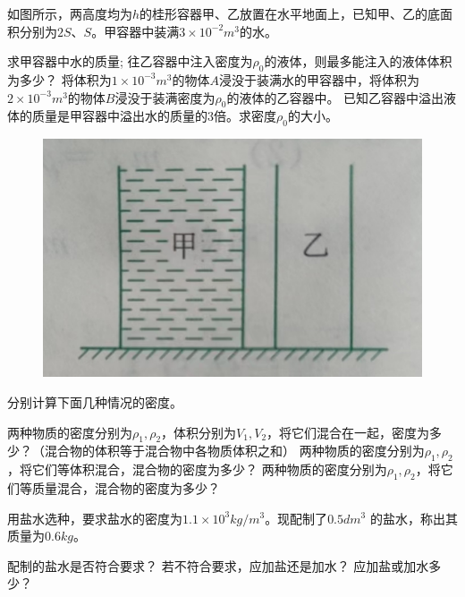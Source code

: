 \documentclass[a4paper,cs4size]{BHCexam}
\begin{document}
\begin{groups}
\begin{questions}[]
        \question[5] 如图所示，两高度均为$h$的桂形容器甲、乙放置在水平地面上，已知甲、乙的底面积分别为$2S$、$S$。甲容器中装满$3\times 10^{-2}m^3$的水。
        \begin{subquestions}
            \subquestion 求甲容器中水的质量;
            \subquestion 往乙容器中注入密度为$\rho_0$的液体，则最多能注入的液体体积为多少？
            \subquestion 将体积为$1\times 10^{-3}m^3$的物体$A$浸没于装满水的甲容器中，将体积为$2\times 10^{-3}m^3$的物体$B$浸没于装满密度为$\rho_0$的液体的乙容器中。
            已知乙容器中溢出液体的质量是甲容器中溢出水的质量的$3$倍。求密度$\rho_0$的大小。
        \end{subquestions}
        \begin{figure}[htb]
            \flushright
            \includegraphics [scale=0.4,trim=0 0 0 0]{./image/physics_mass_2.PNG}
            \label{fig:fig_mass_2}
        \end{figure}
        \vspace{6.5cm}

        \question[5] 分别计算下面几种情况的密度。
        \begin{subquestions}
            \subquestion 两种物质的密度分别为$\rho_1,\rho_2$，体积分别为$V_1,V_2$，将它们混合在一起，密度为多少？（混合物的体积等于混合物中各物质体积之和）
            \subquestion 两种物质的密度分别为$\rho_1,\rho_2$，将它们等体积混合，混合物的密度为多少？
            \subquestion 两种物质的密度分别为$\rho_1,\rho_2$，将它们等质量混合，混合物的密度为多少？
        \end{subquestions}
        \vspace{6.5cm}

        \question[5] 用盐水选种，要求盐水的密度为$1.1\times 10^3 kg/m^3$。现配制了$0.5dm^3$
        的盐水，称出其质量为$0.6kg$。
        \begin{subquestions}
            \subquestion 配制的盐水是否符合要求？
            \subquestion 若不符合要求，应加盐还是加水？
            \subquestion 应加盐或加水多少？
        \end{subquestions}
        \vspace{6.5cm}


\end{questions}
\end{groups}
\end{document}
